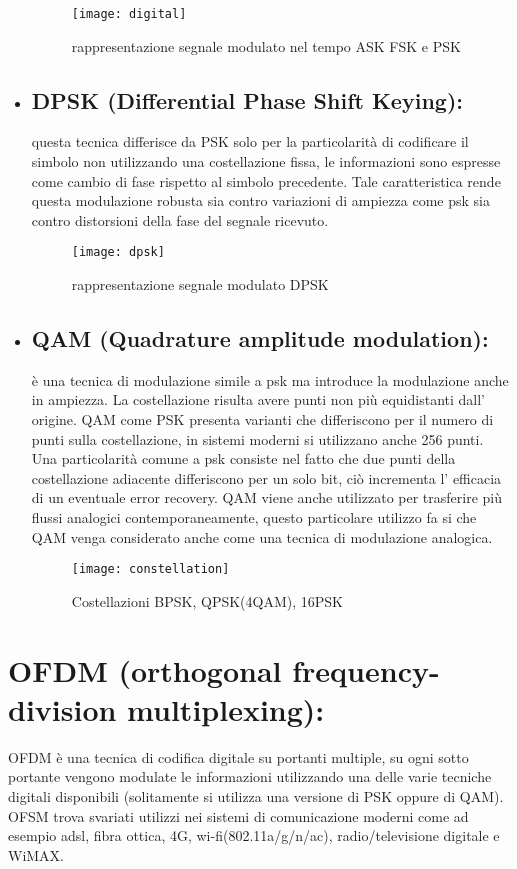 \begin{itemize}
  \begin{figure}[h]
  	\centering
  	\texttt{[image: digital]}
  	\caption{rappresentazione segnale modulato nel tempo ASK FSK e PSK \cite{digit}}\label{fig:1}
  \end{figure}
  \item \subsection{DPSK (Differential Phase Shift Keying): } questa tecnica differisce da PSK solo per la particolarità di codificare il simbolo non utilizzando una costellazione fissa, le informazioni sono espresse come cambio di fase rispetto al simbolo precedente. Tale caratteristica rende questa modulazione robusta sia contro variazioni di ampiezza come psk sia contro distorsioni della fase del segnale ricevuto.
  \begin{figure}[h]
  	\centering
  	\texttt{[image: dpsk]}
  	\caption{rappresentazione segnale modulato DPSK \cite{dpsk}}\label{fig:1}
  \end{figure}
    
  \item \subsection{QAM (Quadrature amplitude modulation): } è una tecnica di modulazione simile a psk ma introduce la modulazione anche in ampiezza. La costellazione risulta avere punti non più equidistanti dall' origine. QAM come PSK presenta varianti che differiscono per il numero di punti sulla costellazione, in sistemi moderni si utilizzano anche 256 punti. Una particolarità comune a psk consiste nel fatto che due punti della costellazione adiacente differiscono per un solo bit, ciò incrementa l' efficacia di un eventuale error recovery. QAM viene anche utilizzato per trasferire più flussi analogici contemporaneamente, questo particolare utilizzo fa si che QAM venga considerato anche come una tecnica di modulazione analogica. 
  \cite{qam}
  
  \begin{figure}[h]
	\centering
	\texttt{[image: constellation]}
	\caption{Costellazioni BPSK, QPSK(4QAM), 16PSK \cite{psk-constellation}}\label{fig:1}
  \end{figure} 
  \end{itemize}


\section{OFDM (orthogonal frequency-division multiplexing): }
OFDM è una tecnica di codifica digitale su portanti multiple, su ogni sotto portante vengono modulate le informazioni utilizzando una delle varie tecniche digitali disponibili (solitamente si utilizza una versione di PSK oppure di QAM). OFSM trova svariati utilizzi nei sistemi di comunicazione moderni come ad esempio adsl, fibra ottica, 4G, wi-fi(802.11a/g/n/ac), radio/televisione digitale e WiMAX.
\cite{ofdm}
\cite{ofdm2}

